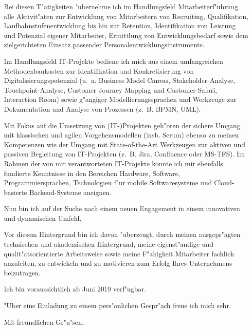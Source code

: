 \documentclass[10pt,a4paper]{dinbrief}
\begin{document}
\begin{letter}
Bei diesen T"atigkeiten "ubernehme ich im Handlungsfeld Mitarbeiterf"uhrung alle Aktivit"aten zur Entwicklung von Mitarbeitern von Recruiting, Qualifikation, Laufbahnstufenentwicklung bis hin zur Retention, Identifikation von Leistung und Potenzial eigener Mitarbeiter, Ermittlung von Entwicklungsbedarf sowie dem zielgerichteten Einsatz passender Personalentwicklungsinstrumente.

Im Handlungsfeld IT-Projekte bediene ich mich aus einem umfangreichen Methodenbaukasten zur Identifikation und Konkretisierung von Digitalisierungspotenzial (u.~a. Business Model Canvas, Stakeholder-Analyse, Touchpoint-Analyse, Customer Journey Mapping und Customer Safari, Interaction Room) sowie g"angiger Modellierungssprachen und Werkzeuge zur Dokumentation und Analyse von Prozessen (z.~B. BPMN, UML).

Mit Fokus auf die Umsetzung von (IT-)Projekten geh"oren der sichere Umgang mit klassischen und agilen Vorgehensmodellen (insb. Scrum) ebenso zu meinen Kompetenzen wie der Umgang mit State-of-the-Art Werkzeugen zur aktiven und passiven Begleitung von IT-Projekten (z.~B. Jira, Confluence oder MS-TFS). Im Rahmen der von mir verantworteten IT-Projekte konnte ich mir ebenfalls fundierte Kenntnisse in den Bereichen Hardware, Software, Programmiersprachen, Technologien f"ur mobile Softwaresysteme und Cloud-basierte Backend-Systeme aneignen.

Nun bin ich auf der Suche nach einem neuen Engagement in einem innovativen und dynamischen Umfeld.

Vor diesem Hintergrund bin ich davon "uberzeugt, durch meinen ausgepr"agten technischen und akademischen Hintergrund, meine eigenst"andige und qualit"atsorientierte Arbeitsweise sowie meine F"ahigkeit Mitarbeiter fachlich anzuleiten, zu entwickeln und zu motivieren zum Erfolg Ihres Unternehmens beizutragen.

Ich bin voraussichtlich ab Juni 2019 verf"ugbar.

"Uber eine Einladung zu einem pers"onlichen Gespr"ach freue ich mich sehr.

\closing{Mit freundlichen Gr"u"sen,}
\end{letter}
\end{document}
